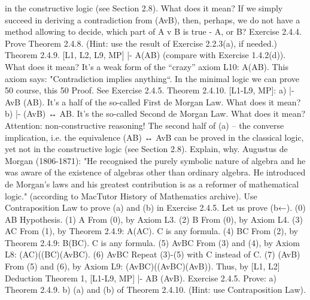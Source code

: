 in the constructive logic (see Section 2.8). What does it mean? If we simply succeed in deriving a
contradiction from \neg (AvB), then, perhaps, we do not have a method allowing to decide, which part of
\neg \neg A v \neg \neg B is true - \neg \neg A, or \neg \neg B?
Exercise 2.4.4. Prove Theorem 2.4.8. (Hint: use the result of Exercise 2.2.3(a), if needed.)
Theorem 2.4.9. [L1, L2, L9, MP] |- \neg A\IMPLIES (A\IMPLIES \neg B) (compare with Exercise 1.4.2(d)). What does it mean?
It's a weak form of the ``crazy'' axiom L10: \neg A\IMPLIES (A\IMPLIES B). This axiom says: "Contradiction implies
anything``. In the minimal logic we can prove 50%
course, this 50%
Proof. See Exercise 2.4.5.
Theorem 2.4.10. [L1-L9, MP]:
a) |- \neg Av\neg B \IMPLIES  \neg (A\AND B). It's a half of the so-called First de Morgan Law. What does it mean?
b) |- \neg (AvB) ↔ \neg A\AND \neg B. It's the so-called Second de Morgan Law. What does it mean?
Attention: non-constructive reasoning! The second half of (a) – the converse implication, i.e. the
equivalence \neg (A\AND B) ↔ \neg Av\neg B can be proved in the classical logic, yet not in the constructive logic (see
Section 2.8). Explain, why.
Augustus de Morgan (1806-1871): "He recognised the purely symbolic nature of algebra and he was aware of the existence of
algebras other than ordinary algebra. He introduced de Morgan's laws and his greatest contribution is as a reformer of
mathematical logic." (according to MacTutor History of Mathematics archive).
Use Contraposition Law to prove (a) and (b\IMPLIES ) in Exercise 2.4.5.
Let us prove (b←).
(0) \neg A\AND \neg B Hypothesis.
(1) \neg A From (0), by Axiom L3.
(2) \neg B From (0), by Axiom L4.
(3) A\IMPLIES \neg C From (1), by Theorem 2.4.9: \neg A\IMPLIES (A\IMPLIES \neg C).
                 C is any formula.
(4) B\IMPLIES \neg C From (2), by Theorem 2.4.9: \neg B\IMPLIES (B\IMPLIES \neg C).
                 C is any formula.
(5) AvB\IMPLIES \neg C From (3) and (4), by Axiom L8:
             (A\IMPLIES \neg C)\IMPLIES ((B\IMPLIES \neg C)\IMPLIES (AvB\IMPLIES \neg C).
(6) AvB\IMPLIES \neg \neg C Repeat (3)-(5) with \neg \neg C instead of \neg C.
(7) \neg (AvB) From (5) and (6), by Axiom L9:
           (AvB\IMPLIES \neg C)\IMPLIES ((AvB\IMPLIES \neg \neg C)\IMPLIES \neg (AvB)).
Thus, by [L1, L2] Deduction Theorem 1, [L1-L9, MP] |- \neg A\AND \neg B \IMPLIES  \neg (AvB).
Exercise 2.4.5. Prove:
a) Theorem 2.4.9.
b) (a) and (b\IMPLIES ) of Theorem 2.4.10. (Hint: use Contraposition Law).
